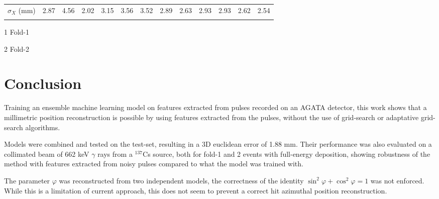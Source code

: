 \begin{table}[h]
\begin{threeparttable}
\begin{tabular}{l r r r r r r r r r r r r}
      $\sigma_X$ (mm)    & 2.87   & 4.56   & 2.02   & 3.15   & 3.56   & 3.52  & 2.89   & 2.63  & 2.93   & 2.93  & 2.62   & 2.54 \\
      \\
      \bottomrule
    \end{tabular}
    \begin{tablenotes}
      \item[1] Fold-1
      \item[2] Fold-2
    \end{tablenotes}
  \end{threeparttable}
\end{table}

\section{Conclusion}
Training an ensemble machine learning model on features extracted from pulses recorded on an AGATA detector, this work shows that a millimetric position reconstruction is possible by using features extracted from the pulses, without the use of grid-search or adaptative grid-search algorithms.

Models were combined and tested on the test-set, resulting in a 3D euclidean error of 1.88 mm. Their performance was also evaluated on a collimated beam of 662 keV $\gamma$ rays from a $^{137}$Cs source, both for fold-1 and 2 events with full-energy deposition, showing robustness of the method with features extracted from noisy pulses compared to what the model was trained with.

The parameter $\varphi$ was reconstructed from two independent models, the correctness of the identity \ensuremath{\sin^2 \varphi + \cos^2 \varphi = 1} was not enforced. While this is a limitation of current approach, this does not seem to prevent a correct hit azimuthal position reconstruction.
%
%
